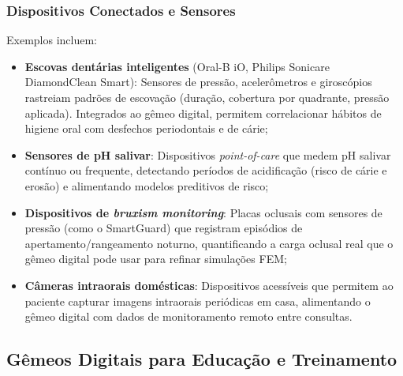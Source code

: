 \subsubsection{Dispositivos Conectados e Sensores}

Exemplos incluem:

\begin{itemize}
    \item \textbf{Escovas dentárias inteligentes} (Oral-B iO, Philips Sonicare DiamondClean Smart): Sensores de pressão, acelerômetros e giroscópios rastreiam padrões de escovação (duração, cobertura por quadrante, pressão aplicada). Integrados ao gêmeo digital, permitem correlacionar hábitos de higiene oral com desfechos periodontais e de cárie;

    \item \textbf{Sensores de pH salivar}: Dispositivos \textit{point-of-care} que medem pH salivar contínuo ou frequente, detectando períodos de acidificação (risco de cárie e erosão) e alimentando modelos preditivos de risco;

    \item \textbf{Dispositivos de \textit{bruxism monitoring}}: Placas oclusais com sensores de pressão (como o SmartGuard) que registram episódios de apertamento/rangeamento noturno, quantificando a carga oclusal real que o gêmeo digital pode usar para refinar simulações FEM;

    \item \textbf{Câmeras intraorais domésticas}: Dispositivos acessíveis que permitem ao paciente capturar imagens intraorais periódicas em casa, alimentando o gêmeo digital com dados de monitoramento remoto entre consultas.
\end{itemize}


\subsection{Gêmeos Digitais para Educação e Treinamento}

